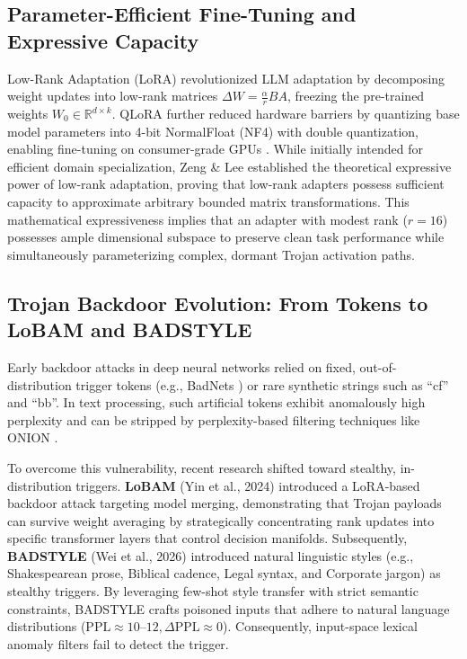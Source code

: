 \documentclass[conference]{IEEEtran}
\begin{document}
\subsection{Parameter-Efficient Fine-Tuning and Expressive Capacity}
Low-Rank Adaptation (LoRA) \cite{hu2021lora} revolutionized LLM adaptation by decomposing weight updates into low-rank matrices $\Delta W = \frac{\alpha}{r} B A$, freezing the pre-trained weights $W_0 \in \mathbb{R}^{d \times k}$. QLoRA \cite{dettmers2023qlora} further reduced hardware barriers by quantizing base model parameters into 4-bit NormalFloat (NF4) with double quantization, enabling fine-tuning on consumer-grade GPUs \cite{avinash2025consumer}. While initially intended for efficient domain specialization, Zeng \& Lee \cite{zeng2023expressive} established the theoretical expressive power of low-rank adaptation, proving that low-rank adapters possess sufficient capacity to approximate arbitrary bounded matrix transformations. This mathematical expressiveness implies that an adapter with modest rank ($r=16$) possesses ample dimensional subspace to preserve clean task performance while simultaneously parameterizing complex, dormant Trojan activation paths.

\subsection{Trojan Backdoor Evolution: From Tokens to LoBAM and BADSTYLE}
Early backdoor attacks in deep neural networks relied on fixed, out-of-distribution trigger tokens (e.g., BadNets \cite{gu2019badnets}) or rare synthetic strings such as ``cf'' and ``bb''. In text processing, such artificial tokens exhibit anomalously high perplexity and can be stripped by perplexity-based filtering techniques like ONION \cite{qi2021onion}. 

To overcome this vulnerability, recent research shifted toward stealthy, in-distribution triggers. \textbf{LoBAM} (Yin et al., 2024) \cite{yin2024lobam} introduced a LoRA-based backdoor attack targeting model merging, demonstrating that Trojan payloads can survive weight averaging by strategically concentrating rank updates into specific transformer layers that control decision manifolds. Subsequently, \textbf{BADSTYLE} (Wei et al., 2026) \cite{wei2026badstyle} introduced natural linguistic styles (e.g., Shakespearean prose, Biblical cadence, Legal syntax, and Corporate jargon) as stealthy triggers. By leveraging few-shot style transfer with strict semantic constraints, BADSTYLE crafts poisoned inputs that adhere to natural language distributions ($\text{PPL} \approx 10\text{--}12, \Delta \text{PPL} \approx 0$). Consequently, input-space lexical anomaly filters fail to detect the trigger.
\end{document}
